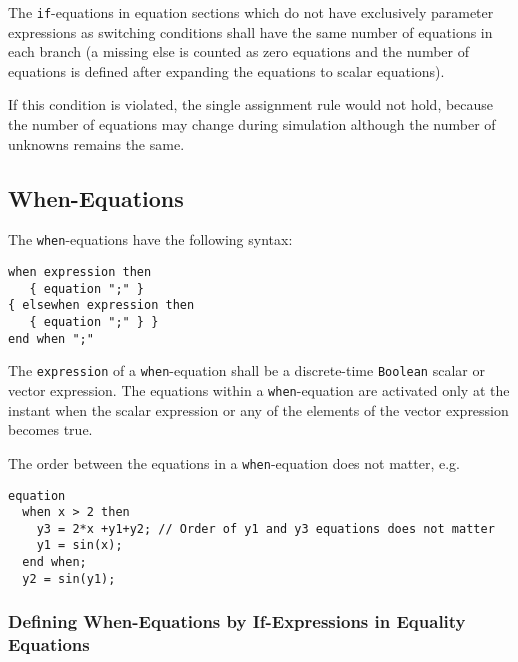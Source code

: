 The \lstinline!if!-equations in equation sections which do not have exclusively parameter expressions as switching conditions shall have the same number of equations in each branch (a missing else is counted as zero equations and the number of equations is defined after expanding the equations to scalar equations).

\begin{nonnormative}
If this condition is violated, the single assignment rule would not hold, because the number of equations may change during simulation
although the number of unknowns remains the same.
\end{nonnormative}

\subsection{When-Equations}\label{when-equations}

The \lstinline!when!-equations have the following syntax:
\begin{lstlisting}[language=grammar]
when expression then
   { equation ";" }
{ elsewhen expression then
   { equation ";" } }
end when ";"
\end{lstlisting}

The \lstinline!expression! of a \lstinline!when!-equation shall be a discrete-time \lstinline!Boolean! scalar or vector expression.
The equations within a \lstinline!when!-equation are activated only at the instant when the scalar expression or any of the elements of the vector expression becomes true.

\begin{example}
The order between the equations in a \lstinline!when!-equation does not matter, e.g.
\begin{lstlisting}[language=modelica]
equation
  when x > 2 then
    y3 = 2*x +y1+y2; // Order of y1 and y3 equations does not matter
    y1 = sin(x);
  end when;
  y2 = sin(y1);
\end{lstlisting}
\end{example}

\subsubsection{Defining When-Equations by If-Expressions in Equality Equations}\label{defining-when-equations-by-if-expressions-in-equality-equations}

